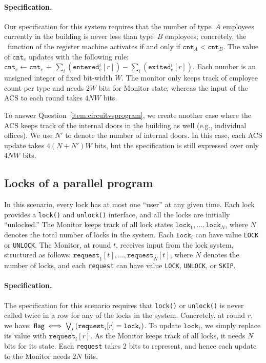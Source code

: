 \paragraph{Specification.} Our specification for this system requires that the number of type~$A$ employees currently in the building is never less than type~$B$ employees;
concretely, the \isbad~function of the register machine activates if and only if $\texttt{cnt}_A < \texttt{cnt}_B$.
The value of $\texttt{cnt}_e$ updates with the following rule:
$\texttt{cnt}_e \leftarrow
    \texttt{cnt}_e \,+\, \sum_{i} \left(
    \texttt{entered}_e^i[r]\right) - \sum_{i} \left(\texttt{exited}_e^i[r] \right)$.
Each number is an unsigned integer of fixed bit-width $W$.
The monitor only keeps track of employee count per type and needs $2W$ bits for Monitor state, whereas the input of the ACS to each round takes $4NW$ bits.

To answer Question~\ref{item:circuitvsprogram}, we create another case where the ACS keeps track of the internal doors in the building as well (e.g., individual offices). We use $N'$ to denote the number of internal doors. In this case, each ACS update takes $4(N+N')W$ bits, but the specification is still expressed over only $4NW$ bits.

\subsection{Locks of a parallel program}\label{sec:locks}

In this scenario, every lock has at most one ``user'' at any given time. Each lock provides a \texttt{lock()} and \texttt{unlock()} interface, and all the locks are initially ``unlocked.''
The Monitor keeps track of all lock states $\texttt{lock}_1, \dots, \texttt{lock}_N$, where $N$ denotes the total number of locks in the system. Each $\texttt{lock}_i$ can have value \texttt{LOCK} or \texttt{UNLOCK}.
The Monitor, at round $t$, receives input from the lock system, structured as follows: $\texttt{request}_1[t], \dots, \texttt{request}_N[t]$,
where $N$ denotes the number of locks, and each \texttt{request} can have value \texttt{LOCK}, \texttt{UNLOCK}, or \texttt{SKIP}.

\paragraph{Specification.} The specification for this scenario requires that \texttt{lock()} or \texttt{unlock()} is never called twice in a row for any of the locks in the system. Concretely, at round $r$, we have:
$ \textsf{flag} \iff \bigvee_i \left(
    \texttt{request}_i[r] = \texttt{lock}_i \right) $.
To update $\texttt{lock}_i$, we simply replace its value with $\texttt{request}_i[r]$.
As the Monitor keeps track of all locks, it needs $N$ bits for its state.
Each \texttt{request} takes 2 bits to represent, and hence each update to the Monitor needs $2 N$ bits.

